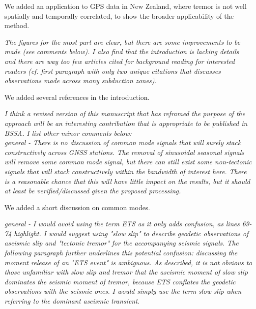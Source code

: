 \documentclass[letterpaper, 12pt]{article}
\begin{document}
\bigskip

We added an application to GPS data in New Zealand, where tremor is not well spatially and temporally correlated, to show the broader applicability of the method.

\bigskip

\textit{The figures for the most part are clear, but there are some improvements to be made (see comments below). I also find that the introduction is lacking details and there are way too few articles cited for background reading for interested readers (cf. first paragraph with only two unique citations that discusses observations made across many subduction zones).}

\bigskip

We added several references in the introduction.

\bigskip

\textit{I think a revised version of this manuscript that has reframed the purpose of the approach will be an interesting contribution that is appropriate to be published in BSSA. I list other minor comments below:} \\

\textit{general - There is no discussion of common mode signals that will surely stack constructively across GNSS stations. The removal of sinusoidal seasonal signals will remove some common mode signal, but there can still exist some non-tectonic signals that will stack constructively within the bandwidth of interest here. There is a reasonable chance that this will have little impact on the results, but it should at least be verified/discussed given the proposed processing.}

\bigskip

We added a short discussion on common modes.

\bigskip

\textit{general - I would avoid using the term ETS as it only adds confusion, as lines 69-74 highlight. I would suggest using "slow slip" to describe geodetic observations of aseismic slip and "tectonic tremor" for the accompanying seismic signals. The following paragraph further underlines this potential confusion: discussing the moment release of an "ETS event" is ambiguous. As described, it is not obvious to those unfamiliar with slow slip and tremor that the aseismic moment of slow slip dominates the seismic moment of tremor, because ETS conflates the geodetic observations with the seismic ones. I would simply use the term slow slip when referring to the dominant aseismic transient.}
\end{document}
